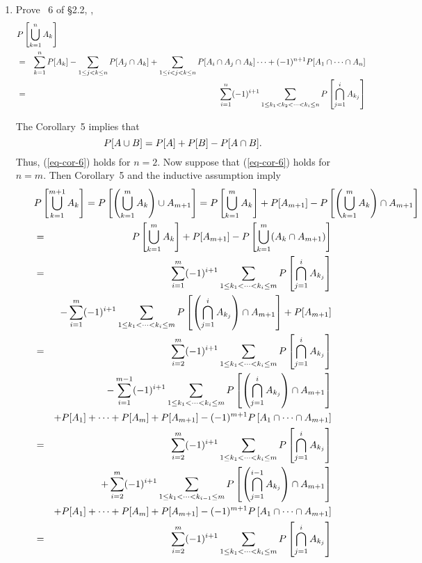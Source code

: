 \begin{enumerate}
	\item Prove \corollaryname~$6$ of \S2.2, \ie,
	\begin{eqnarray}
	\nonumber
		\lefteqn{
		\bpr{ \bigcup_{k=1}^{n} A_k }
		}
		\\&=& \sum_{k=1}^n \pr{A_k}
		- \sum_{1\leq j<k\leq n} \pr{A_j\cap A_k}
		+ \sum_{1\leq i<j<k\leq n} \pr{A_i\cap A_j\cap A_k}
		\cdots
		+ (-1)^{n+1} \pr{A_1\cap \cdots \cap A_n}
		\nonumber
		\\&=& \sum_{i=1}^n (-1)^{i+1} \sum_{1\leq k_1<k_2<\cdots<k_i \leq n} \bpr{\bigcap_{j=1}^i A_{k_j}}
		\label{eq-cor-6}
	\end{eqnarray}
	\ifdefined\sol
	\begin{solution}
	The Corollary~5 implies that
	\[
		P[A\cup B] = P[A] + P[B] - P[A\cap B].
	\]
	Thus, (\ref{eq-cor-6}) holds for $n=2$.
	Now suppose that (\ref{eq-cor-6}) holds for $n=m$.
	Then Corollary~5 and the inductive assumption imply
	\begin{eqnarray*}
		\lefteqn{
		\bpr{ \bigcup_{k=1}^{m+1} A_k }
		= \bpr{ \left( \bigcup_{k=1}^{m} A_k \right) \cup A_{m+1} }
		= \bpr{ \bigcup_{k=1}^{m} A_k } + \pr{A_{m+1}}
		 - \bpr{ \left( \bigcup_{k=1}^{m} A_k \right) \cap A_{m+1} }
		}
		\\&=& \bpr{ \bigcup_{k=1}^{m} A_k } + \pr{A_{m+1}}
		 - \bpr{ \bigcup_{k=1}^{m} (A_k \cap A_{m+1}) }
		\\&=& \sum_{i=1}^m (-1)^{i+1} \sum_{1\leq k_1<\cdots<k_i \leq m} \bpr{\bigcap_{j=1}^i A_{k_j}}
		\\&&
		- \sum_{i=1}^m (-1)^{i+1} \sum_{1\leq k_1<\cdots<k_i \leq m} \bpr{\left(\bigcap_{j=1}^i A_{k_j}\right)\cap A_{m+1}}
		 + \pr{A_{m+1}}
		\\&=& \sum_{i=2}^m (-1)^{i+1} \sum_{1\leq k_1<\cdots<k_i \leq m} \bpr{\bigcap_{j=1}^i A_{k_j}}
		\\&&- \sum_{i=1}^{m-1} (-1)^{i+1} \sum_{1\leq k_1<\cdots<k_i \leq m} \bpr{\left(\bigcap_{j=1}^i A_{k_j}\right)\cap A_{m+1}}
		\\&& + \pr{A_1} + \cdots + \pr{A_m} + \pr{A_{m+1}} - (-1)^{m+1}\bpr{A_1\cap \cdots \cap A_{m+1}}
		\\&=& \sum_{i=2}^m (-1)^{i+1} \sum_{1\leq k_1<\cdots<k_i \leq m} \bpr{\bigcap_{j=1}^i A_{k_j}}
		\\&&+ \sum_{i=2}^{m} (-1)^{i+1} \sum_{1\leq k_1<\cdots<k_{i-1} \leq m} \bpr{\left(\bigcap_{j=1}^{i-1} A_{k_j}\right)\cap A_{m+1}}
		\\&& + \pr{A_1} + \cdots + \pr{A_m} + \pr{A_{m+1}} - (-1)^{m+1}\bpr{A_1\cap \cdots \cap A_{m+1}}
		\\&=& \sum_{i=2}^m (-1)^{i+1} \sum_{1\leq k_1<\cdots<k_i \leq m} \bpr{\bigcap_{j=1}^i A_{k_j}}

\end{eqnarray*}
\end{solution}
\end{enumerate}
